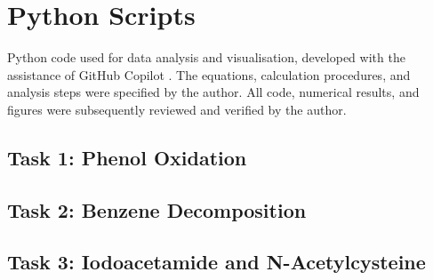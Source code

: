 \section{Python Scripts}
\label{app:python-scripts}
Python code used for data analysis and visualisation, developed with the 
assistance of GitHub Copilot \cite{github_copilot_data_analysis_2026}. 
The equations, calculation procedures, and analysis steps were specified by the author. 
All code, numerical results, and figures were subsequently reviewed and verified by the author.
\subsection{Task 1: Phenol Oxidation}


\subsection{Task 2: Benzene Decomposition}


\subsection{Task 3: Iodoacetamide and N-Acetylcysteine}

